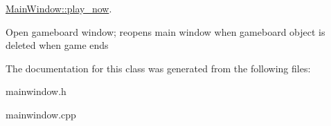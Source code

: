 \hyperlink{class_main_window_a1f2fc891d85eda505b42a3e9026a56b0}{Main\+Window\+::play\+\_\+now}. 

Open gameboard window; reopens main window when gameboard object is deleted when game ends 

The documentation for this class was generated from the following files\+:\begin{DoxyCompactItemize}
\item 
mainwindow.\+h\item 
mainwindow.\+cpp\end{DoxyCompactItemize}
